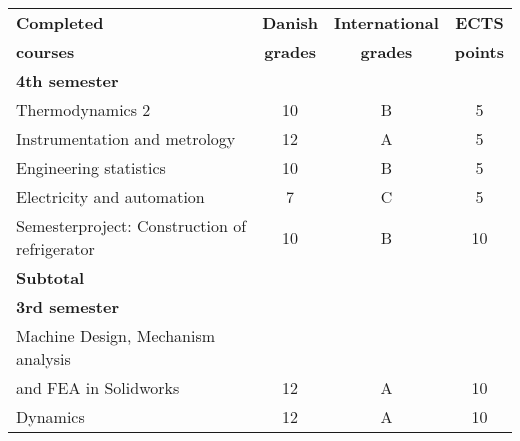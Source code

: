 \documentclass[letterpaper]{twentysecondcv} %
\begin{document}
	\begin{tabular}{lccc}
		\toprule[0.3mm]
		\textbf{Completed}      & \textbf{Danish}       & \textbf{International}    & \textbf{ECTS}	    \\
		\textbf{courses}        & \textbf{grades}       & \textbf{grades}           & \textbf{points}   \\ \midrule[.3mm] 
		
		\textbf{4th semester}   &                       &                           &                   \\  \hline \hline 
		Thermodynamics 2        & 10                    & B                         & 5                 \\ 
		Instrumentation and metrology       & 12        & A                         & 5                 \\
		Engineering statistics              & 10        & B                         & 5                 \\
		Electricity and automation          & 7         & C                         & 5                 \\
		Semesterproject: Construction of refrigerator & 10 & B                      & 10                \\
		\textbf{Subtotal}       &                       &                           & \fbox{\textbf{30}} \vspace{2mm}\\ \hline
		\textbf{3rd semester}		& 						    & 						&           \\ \hline \hline
		Machine Design, Mechanism analysis \\ and 
		FEA in Solidworks   & 12            & A                     & 10        \\
		
		Dynamics                    & 12                        & A                     & 10        \\
		

\end{tabular}
\end{document}
